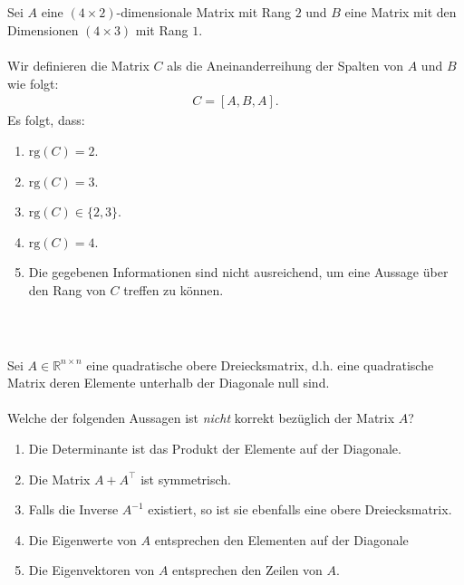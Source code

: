 \subsection*{}
Sei $ A $ eine $ (4 \times 2) $-dimensionale Matrix mit Rang $ 2 $ und $ B $ eine Matrix mit den Dimensionen $ (4 \times 3) $ mit Rang $ 1 $.\\
\\
Wir definieren die Matrix $ C $ als die Aneinanderreihung der Spalten von $ A $ und $ B $ wie folgt:
\begin{align*}
	C = [A, B, A].
\end{align*}
Es folgt, dass:
\renewcommand{\labelenumi}{(\alph{enumi})}
\begin{enumerate}
	\item 
	$ \mathrm{rg}(C) = 2 $.
	\item
	$ \mathrm{rg}(C) = 3 $.
	\item
	$ \mathrm{rg}(C)\in \{2,3\} $.
	\item
	$ \mathrm{rg}(C) = 4 $.
	\item
	Die gegebenen Informationen sind nicht ausreichend, um eine Aussage über den Rang von $ C $ treffen zu können.
\end{enumerate}
\ \\
\subsection*{}
Sei $ A \in \mathbb{R}^{n\times n} $ eine quadratische obere Dreiecksmatrix, d.h. eine quadratische Matrix deren Elemente unterhalb der Diagonale null sind.\\
\\
Welche der folgenden Aussagen ist \textit{nicht} korrekt bezüglich der Matrix $ A $?
\renewcommand{\labelenumi}{(\alph{enumi})}
\begin{enumerate}
	\item 
	Die Determinante ist das Produkt der Elemente auf der Diagonale.
	\item
	Die Matrix $ A + A^\top $ ist symmetrisch.
	\item
	Falls die Inverse $ A^{-1} $ existiert, so ist sie ebenfalls eine obere Dreiecksmatrix.
	\item
	Die Eigenwerte von $ A $ entsprechen den Elementen auf der Diagonale
	\item 
	Die Eigenvektoren von $ A $ entsprechen den Zeilen von $ A $.
\end{enumerate}

\newpage
